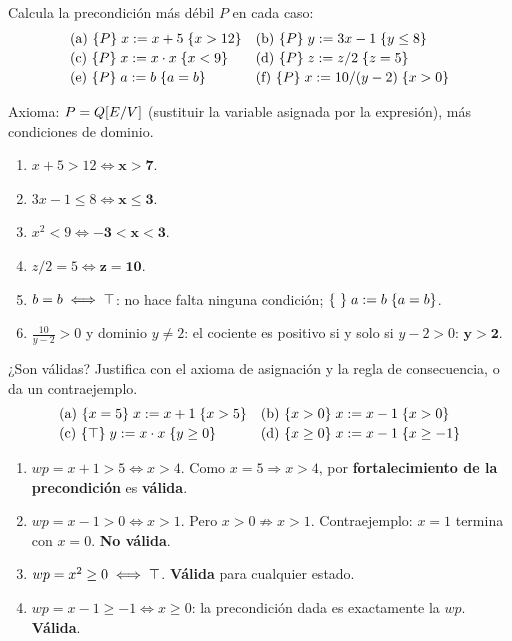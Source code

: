 \begin{prob}
Calcula la precondición más débil $P$ en cada caso:
\[
\begin{array}{ll}
\text{(a) } \{P\}\;x\mathrel{:=} x+5\;\{x>12\} & \text{(b) } \{P\}\;y\mathrel{:=} 3x-1\;\{y\le 8\}\\[2pt]
\text{(c) } \{P\}\;x\mathrel{:=} x\cdot x\;\{x<9\} & \text{(d) } \{P\}\;z\mathrel{:=} z/2\;\{z=5\}\\[2pt]
\text{(e) } \{P\}\;a\mathrel{:=} b\;\{a=b\} & \text{(f) } \{P\}\;x\mathrel{:=} 10/(y-2)\;\{x>0\}
\end{array}
\]
\end{prob}
\begin{sol}
Axioma: $P=Q[E/V]$ (sustituir la variable asignada por la expresión), más condiciones de dominio.
\begin{enumerate}[label=(\alph*)]
\item $x+5>12\iff \mathbf{x>7}$.
\item $3x-1\le8\iff\mathbf{x\le3}$.
\item $x^2<9\iff\mathbf{-3<x<3}$.
\item $z/2=5\iff\mathbf{z=10}$.
\item $b=b\iff\mathbf{\top}$: no hace falta ninguna condición; $\{\ \}\;a\mathrel{:=} b\;\{a=b\}$.
\item $\frac{10}{y-2}>0$ y dominio $y\ne2$: el cociente es positivo si y solo si $y-2>0$: $\mathbf{y>2}$.
\end{enumerate}
\end{sol}

\begin{prob}
¿Son válidas? Justifica con el axioma de asignación y la regla de consecuencia, o da un contraejemplo.
\[
\begin{array}{ll}
\text{(a) }\{x=5\}\;x\mathrel{:=} x+1\;\{x>5\} & \text{(b) }\{x>0\}\;x\mathrel{:=} x-1\;\{x>0\}\\[2pt]
\text{(c) }\{\top\}\;y\mathrel{:=} x\cdot x\;\{y\ge0\} & \text{(d) }\{x\ge0\}\;x\mathrel{:=} x-1\;\{x\ge-1\}
\end{array}
\]
\end{prob}
\begin{sol}
\begin{enumerate}[label=(\alph*)]
\item $wp=x+1>5\iff x>4$. Como $x=5\Rightarrow x>4$, por \textbf{fortalecimiento de la precondición} es \textbf{válida}.
\item $wp=x-1>0\iff x>1$. Pero $x>0\not\Rightarrow x>1$. Contraejemplo: $x=1$ termina con $x=0$. \textbf{No válida}.
\item $wp=x^2\ge0\iff\top$. \textbf{Válida} para cualquier estado.
\item $wp=x-1\ge-1\iff x\ge0$: la precondición dada es exactamente la $wp$. \textbf{Válida}.
\end{enumerate}
\end{sol}

